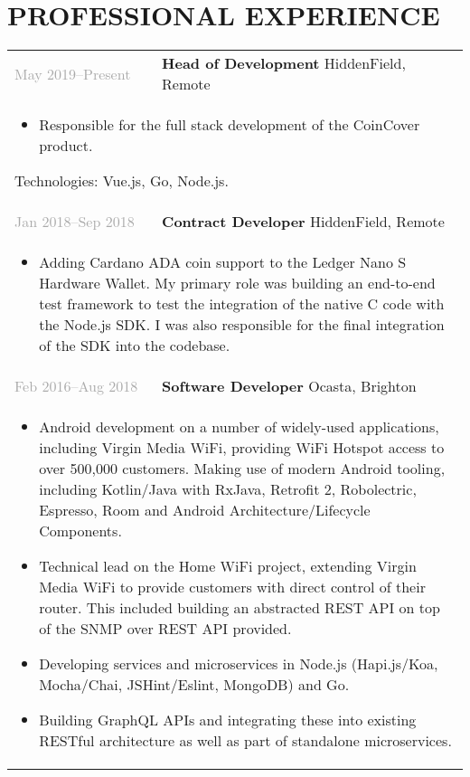 \documentclass{article}
\newenvironment{exptable}{
  \begin{longtable}{lp{0.8\textwidth}}
  }{
  \end{longtable}
}
\begin{document}
  \section*{PROFESSIONAL EXPERIENCE}
    \begin{exptable}
      \textcolor{darkgray}{May 2019--Present}  & \textbf{Head of Development} HiddenField, Remote \\
      \multicolumn{2}{p{\textwidth}}{
        \begin{itemize}
          \item Responsible for the full stack development of the CoinCover product.
        \end{itemize}
      Technologies: Vue.js, Go, Node.js.
      \vspace{1em}
      } \\
      \textcolor{darkgray}{Jan 2018--Sep 2018} & \textbf{Contract Developer} HiddenField, Remote \\
      \multicolumn{2}{p{\textwidth}}{
        \begin{itemize}
          \item Adding Cardano ADA coin support to the Ledger Nano S Hardware Wallet. My primary role was building an end-to-end test framework to test the integration of the native C code with the Node.js SDK. I was also responsible for the final integration of the SDK into the codebase.
        \end{itemize}
      } \\
      \textcolor{darkgray}{Feb 2016--Aug 2018} & \textbf{Software Developer} Ocasta, Brighton \\
      \multicolumn{2}{p{\textwidth}}{
        \begin{itemize}
          \item Android development on a number of widely-used applications, including Virgin Media WiFi, providing WiFi Hotspot access to over 500,000 customers. Making use of modern Android tooling, including Kotlin/Java with RxJava, Retrofit 2, Robolectric, Espresso, Room and Android Architecture/Lifecycle Components.
          \item Technical lead on the Home WiFi project, extending Virgin Media WiFi to provide customers with direct control of their router. This included building an abstracted REST API on top of the SNMP over REST API provided.
          \item Developing services and microservices in Node.js (Hapi.js/Koa, Mocha/Chai, JSHint/Eslint, MongoDB) and Go.
          \item Building GraphQL APIs and integrating these into existing RESTful architecture as well as part of standalone microservices.

\end{itemize}}
\end{exptable}
\end{document}
